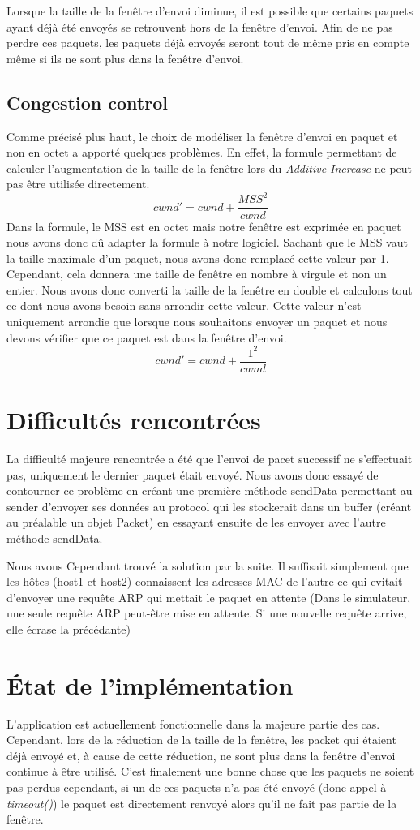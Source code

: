 \documentclass{article}
\begin{document}
Lorsque la taille de la fenêtre d'envoi diminue, il est possible que certains paquets ayant déjà été envoyés se retrouvent hors de la fenêtre d'envoi.
Afin de ne pas perdre ces paquets, les paquets déjà envoyés seront tout de même pris en compte même si ils ne sont plus dans la fenêtre d'envoi.


\subsection{Congestion control}
Comme précisé plus haut, le choix de modéliser la fenêtre d'envoi en paquet et non en octet a apporté quelques problèmes.
En effet, la formule permettant de calculer l'augmentation de la taille de la fenêtre lors du \textit{Additive Increase}
ne peut pas être utilisée directement.
\[
    cwnd' = cwnd + \frac{MSS^2}{cwnd}
\]
Dans la formule, le MSS est en octet mais notre fenêtre est exprimée en paquet nous avons donc dû adapter la formule à notre logiciel.
Sachant que le MSS vaut la taille maximale d'un paquet, nous avons donc remplacé cette valeur par 1.
Cependant, cela donnera une taille de fenêtre en nombre à virgule et non un entier. Nous avons donc converti la taille de la fenêtre
en double et calculons tout ce dont nous avons besoin sans arrondir cette valeur.
Cette valeur n'est uniquement arrondie que lorsque nous souhaitons envoyer un paquet et nous devons vérifier que ce paquet est dans la fenêtre d'envoi.
\[
    cwnd' = cwnd + \frac{1^2}{cwnd}
\]  

\newpage

\section{Difficultés rencontrées}
La difficulté majeure rencontrée a été que l'envoi de pacet successif ne s'effectuait pas, uniquement le dernier paquet était envoyé.
Nous avons donc essayé de contourner ce problème en créant une première méthode sendData permettant au sender d'envoyer ses données au protocol
qui les stockerait dans un buffer (créant au préalable un objet Packet) en essayant ensuite de les envoyer avec l'autre méthode sendData.

Nous avons Cependant trouvé la solution par la suite. Il suffisait simplement que les hôtes (host1 et host2) connaissent
les adresses MAC de l'autre ce qui evitait d'envoyer une requête ARP qui mettait le paquet en attente (Dans le simulateur, une seule requête ARP peut-être mise en attente. Si une nouvelle requête arrive, elle écrase la précédante)

\section{\'Etat de l'implémentation}
L'application est actuellement fonctionnelle dans la majeure partie des cas.
Cependant, lors de la réduction de la taille de la fenêtre, les packet qui étaient déjà envoyé et, à cause de cette réduction,
ne sont plus dans la fenêtre d'envoi continue à être utilisé. C'est finalement une bonne chose que les paquets ne soient pas perdus cependant, 
si un de ces paquets n'a pas été envoyé (donc appel à \emph{timeout()}) le paquet est directement renvoyé alors qu'il ne fait pas partie de la fenêtre.
\end{document}
